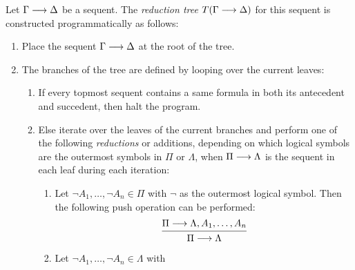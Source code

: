 \documentclass[11pt,a4paper]{article}
\begin{document}
\begin{definition}\label{def:reduction tree}
    Let \(\Gamma\longrightarrow\Delta\) be a sequent.
    The \emph{reduction tree} \(T(\Gamma\longrightarrow\Delta)\)
    for this sequent is constructed
    programmatically as follows:
    \begin{enumerate}
        \item\label{it:reduction tree init}
            Place the sequent \(\Gamma\longrightarrow\Delta\) at the root of the tree.
        \item\label{it:reduction tree loop}
            The branches of the tree are defined by looping over the current
            leaves:
            \begin{enumerate}
                \item\label{it:reduction tree finished}
                    If every topmost sequent contains a same formula
                    in both its antecedent and succedent,
                    then halt the program.
                \item\label{it:reduction tree unfinished}
                    Else iterate over the leaves of the current branches
                    and perform one of the following \emph{reductions} or additions,
                    depending on which logical symbols are the outermost symbols in \(\Pi\) or \(\Lambda\),
                    when \(\Pi\longrightarrow\Lambda\) is the sequent in each leaf during each iteration:
                    \begin{enumerate}
                        \item\label{it:reduction tree lnot left}
                            Let \(\lnot A_1,\ldots,\lnot A_n\in\Pi\) with
                            \(\lnot\) as the outermost logical symbol.
                            Then the following push operation can be performed:
                            \begin{equation}
                                \begin{prooftree}
                                    \tag{reduction:\(\lnot\):left}
                                    \label{eq:reduction:lnot:left}
                                    \hypo{\Pi\seq\Lambda, A_1,\ldots,A_n}
                                    \infer1{\Pi\seq\Lambda}
                                \end{prooftree}
                            \end{equation}
                        \item\label{it:reduction tree lnot right}
                            Let \(\lnot A_1,\ldots,\lnot A_n\in\Lambda\) with

\end{enumerate}
\end{enumerate}
\end{enumerate}
\end{definition}
\end{document}
